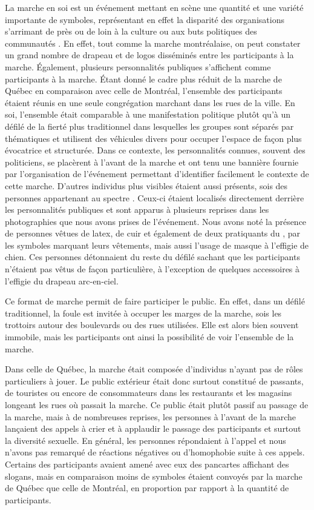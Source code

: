 La marche en soi est un événement mettant en scène une quantité et une variété importante de symboles, représentant en effet la disparité des organisations s'arrimant de près ou de loin à la culture ou aux buts politiques des communautés \lgbt.
En effet, tout comme la marche montréalaise, on peut constater un grand nombre de drapeau et de logos disséminés entre les participants à la marche.
Également, plusieurs personnalités publiques s'affichent comme participants à la marche.
Étant donné le cadre plus réduit de la marche de Québec en comparaison avec celle de Montréal, l'ensemble des participants étaient réunis en une seule congrégation marchant dans les rues de la ville.
En soi, l'ensemble était comparable à une manifestation politique plutôt qu'à un défilé de la fierté plus traditionnel dans lesquelles les groupes sont séparés par thématiques et utilisent des véhicules divers pour occuper l'espace de façon plus évocatrice et structurée.
Dans ce contexte, les personnalités connues, souvent des politiciens, se placèrent à l'avant de la marche et ont tenu une bannière fournie par l'organisation de l'événement permettant d'identifier facilement le contexte de cette marche.
D'autres individus plus visibles étaient aussi présents, sois des personnes appartenant au spectre \bdsm{}.
Ceux-ci étaient localisés directement derrière les personnalités publiques et sont apparus à plusieurs reprises dans les photographies que nous avons prises de l'événement.
Nous avons noté la présence de personnes vêtues de latex, de cuir et également de deux pratiquants du , par les symboles marquant leurs vêtements, mais aussi l'usage de masque à l'effigie de chien.
Ces personnes détonnaient du reste du défilé sachant que les participants n'étaient pas vêtus de façon particulière, à l'exception de quelques accessoires à l'effigie du drapeau arc-en-ciel.

Ce format de marche permit de faire participer le public.
En effet, dans un défilé traditionnel, la foule est invitée à occuper les marges de la marche, sois les trottoirs autour des boulevards ou des rues utilisées.
Elle est alors bien souvent immobile, mais les participants ont ainsi la possibilité de voir l'ensemble de la marche.

Dans celle de Québec, la marche était composée d'individus n'ayant pas de rôles particuliers à jouer.
Le public extérieur était donc surtout constitué de passants, de touristes ou encore de consommateurs dans les restaurants et les magasins longeant les rues où passait la marche.
Ce public était plutôt passif au passage de la marche, mais à de nombreuses reprises, les personnes à l'avant de la marche lançaient des appels à crier et à applaudir le passage des participants et surtout la diversité sexuelle.
En général, les personnes répondaient à l'appel et nous n'avons pas remarqué de réactions négatives ou d'homophobie suite à ces appels.
Certains des participants avaient amené avec eux des pancartes affichant des slogans, mais en comparaison moins de symboles étaient convoyés par la marche de Québec que celle de Montréal, en proportion par rapport à la quantité de participants.

